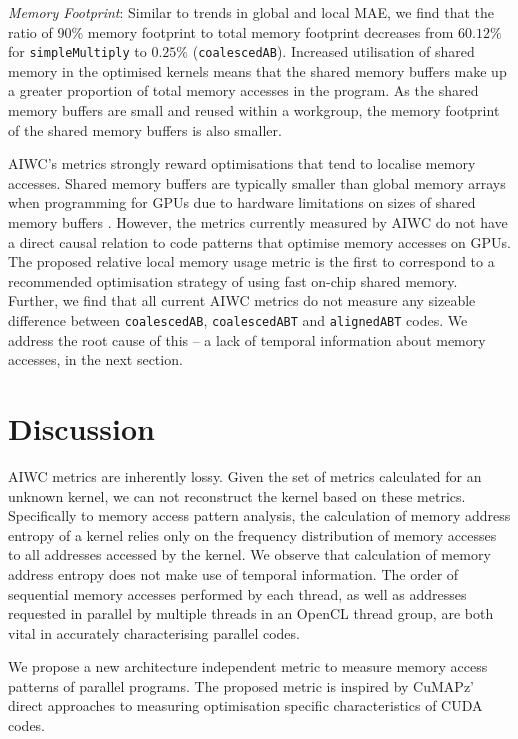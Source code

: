 \documentclass[review=false, sigchi]{acmart}
\begin{document}
	\textit{Memory Footprint}: Similar to trends in global and local MAE, we find that the ratio of 90\% memory footprint to total memory footprint decreases from $60.12\%$ for \texttt{simpleMultiply} to $0.25\%$ (\texttt{coalescedAB}). Increased utilisation of shared memory in the optimised kernels means that the shared memory buffers make up a greater proportion of total memory accesses in the program. As the shared memory buffers are small and reused within a workgroup, the memory footprint of the shared memory buffers is also smaller. 
	
	AIWC's metrics strongly reward optimisations that tend to localise memory accesses. Shared memory buffers are typically smaller than global memory arrays when programming for GPUs due to hardware limitations on sizes of shared memory buffers \cite{cudamanual}. However, the metrics currently measured by AIWC do not have a direct causal relation to code patterns that optimise memory accesses on GPUs. The proposed relative local memory usage metric is the first to correspond to a recommended optimisation strategy of using fast on-chip shared memory. Further, we find that all current AIWC metrics do not measure any sizeable difference between \texttt{coalescedAB}, \texttt{coalescedABT} and \texttt{alignedABT} codes. We address the root cause of this -- a lack of temporal information about memory accesses, in the next section.%
	
	\section{Discussion } \label{discussion}
	
	AIWC metrics are inherently lossy. Given the set of metrics calculated for an unknown kernel, we can not reconstruct the kernel based on these metrics. Specifically to memory access pattern analysis, the calculation of memory address entropy of a kernel relies only on the frequency distribution of memory accesses to all addresses accessed by the kernel. We observe that calculation of memory address entropy does not make use of temporal information. The order of sequential memory accesses performed by each thread, as well as addresses requested in parallel by multiple threads in an OpenCL thread group, are both vital in accurately characterising parallel codes.
	
	We propose a new architecture independent metric to measure memory access patterns of parallel programs. The proposed metric is inspired by CuMAPz' direct approaches to measuring optimisation specific characteristics of CUDA codes.
	
\end{document}
